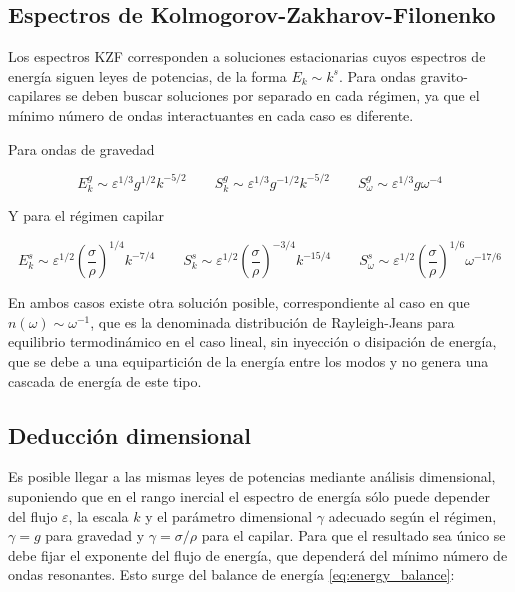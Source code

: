 \subsection{Espectros de Kolmogorov-Zakharov-Filonenko} 
Los espectros KZF corresponden a soluciones estacionarias cuyos espectros de energía siguen leyes de potencias, de la forma $E_k\sim k^{s}$. Para ondas gravito-capilares se deben buscar soluciones por separado en cada régimen, ya que el mínimo número de ondas interactuantes en cada caso es diferente. 

Para ondas de gravedad \cite{zakharovEnergySpectrumStochastic1967} %

\begin{equation}
	E_k^g \sim \varepsilon^{1/3} g^{1/2} k^{-5/2} \qquad S_k^g \sim \varepsilon^{1/3} g^{-1/2} k^{-5/2} \qquad S_\omega^g  \sim \varepsilon^{1/3} g \omega^{-4}
\end{equation}  

Y para el régimen capilar \cite{zakharovWeakTurbulenceCapillary1971}

\begin{equation}
	E_k^s \sim \varepsilon^{1/2} \left(\frac{\sigma}{\rho}\right)^{1/4} k^{-7/4} \qquad S_k^s \sim \varepsilon^{1/2} \left(\frac{\sigma}{\rho}\right)^{-3/4} k^{-15/4} \qquad S_\omega^s  \sim \varepsilon^{1/2} \left(\frac{\sigma}{\rho}\right)^{1/6} \omega^{-17/6}
\end{equation}   

En ambos casos existe otra solución posible, correspondiente al caso en que $n(\omega)\sim \omega^{-1}$, que es la denominada distribución de Rayleigh-Jeans para equilibrio termodinámico en el caso lineal, sin inyección o disipación de energía, que se debe a una equipartición de la energía entre los modos y no genera una cascada de energía de este tipo.  %

\subsection*{Deducción dimensional} 
Es posible llegar a las mismas leyes de potencias mediante análisis dimensional, suponiendo que en el rango inercial el espectro de energía sólo puede depender del flujo $\varepsilon$, la escala $k$ y el parámetro dimensional $\gamma$ adecuado según el régimen, $\gamma=g$ para gravedad y $\gamma=\sigma/\rho$ para el capilar. Para que el resultado sea único se debe fijar el exponente del flujo de energía, que dependerá del mínimo número de ondas resonantes. Esto surge del balance de energía \eqref{eq:energy_balance}: 

